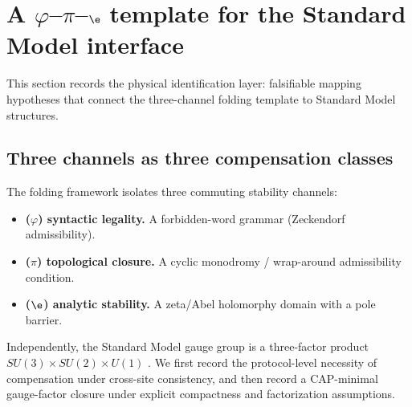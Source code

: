 
\section{A \texorpdfstring{$\varphi$--$\pi$--$\e$}{phi--pi--e} template for the Standard Model interface}
\label{sec:sm_interface}

This section records the physical identification layer: falsifiable mapping hypotheses that connect the three-channel folding template to Standard Model structures.

\subsection{Three channels as three compensation classes}
\label{subsec:gauge_as_compensation}

The folding framework isolates three commuting stability channels:
\begin{itemize}
\item \textbf{($\varphi$) syntactic legality.} A forbidden-word grammar (Zeckendorf admissibility).
\item \textbf{($\pi$) topological closure.} A cyclic monodromy / wrap-around admissibility condition.
\item \textbf{($\e$) analytic stability.} A zeta/Abel holomorphy domain with a pole barrier.
\end{itemize}

Independently, the Standard Model gauge group is a three-factor product $SU(3)\times SU(2)\times U(1)$ \cite{PeskinSchroeder1995}.
We first record the protocol-level necessity of compensation under cross-site consistency, and then record a CAP-minimal gauge-factor closure under explicit compactness and factorization assumptions.

